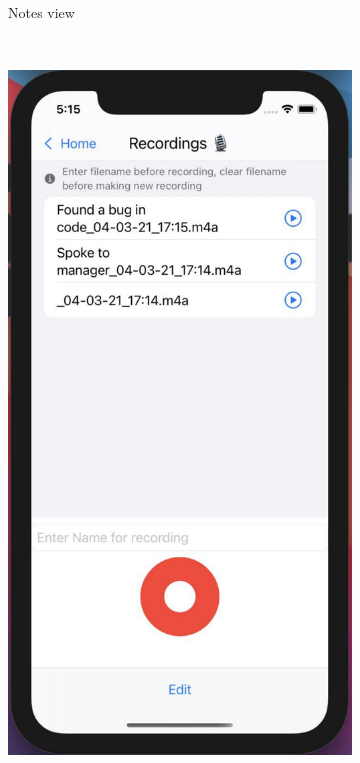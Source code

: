 \documentclass{l4proj}
\begin{document}
\begin{figure}
\begin{subfigure}[b]{0.3\textwidth}
        \caption{Notes view}
        \label{fig:appNotesScreen}
    \end{subfigure}
    ~ %
    \begin{subfigure}[b]{0.3\textwidth}
        \includegraphics[scale=0.25]{images/appRecordingsScreen.pdf}

\end{subfigure}
\end{figure}
\end{document}
